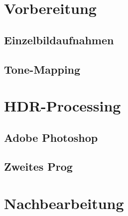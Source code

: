 \documentclass[liststotoc,bibtotoc,fontsize=14pt,]{scrreprt}
\begin{document}
	\chapter{Vorbereitung}
	
	\section{Einzelbildaufnahmen}
	\label{sec:einzel}
	
		\section{Tone-Mapping}
		\label{sec:einzel}

	\chapter{HDR-Processing}
	\label{ch:processing}

	
	\section{Adobe Photoshop}
	\label{sec:photoshop}
	
	
	
	\section{Zweites Prog}
	\label{sec:prog}

	\chapter{Nachbearbeitung}
	\label{ch:nach}
	
	
\end{document}
